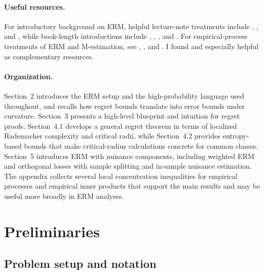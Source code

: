 \documentclass[11pt]{article}
\theoremstyle{plain}
\theoremstyle{definition} %
\begin{document}
\paragraph{Useful resources.}
For introductory background on ERM, helpful lecture-note treatments include
\citet{bartlett2013stat210b}, \citet{guntuboyina2018stat210b}, and
\citet{sen2018gentle}, while book-length introductions include
\citet{shalev2014understanding}, \citet{mohri2018foundations},
\citet{wainwright2019high}, and \citet{koltchinskii2011oracle}. For
empirical-process treatments of ERM and M-estimation, see
\citet{van1996weak}, \citet{geer2000empirical}, and \citet{sen2018gentle}.
I found \citet{sen2018gentle} and \citet{wainwright2019high} especially
helpful as complementary resources.


 \paragraph{Organization.}
Section~2 introduces the ERM setup and the high-probability language used throughout, and recalls how regret bounds translate into error bounds under curvature. Section~3 presents a high-level blueprint and intuition for regret proofs. Section~4.1 develops a general regret theorem in terms of localized Rademacher complexity and critical radii, while Section~4.2 provides entropy-based bounds that make critical-radius calculations concrete for common classes. Section~5 introduces ERM with nuisance components, including weighted ERM and orthogonal losses with sample splitting and in-sample nuisance estimation. The appendix collects several local concentration inequalities for empirical processes and empirical inner products that support the main results and may be useful more broadly in ERM analyses.


\section{Preliminaries}
\label{sec:prelim}
\subsection{Problem setup and notation}
\end{document}
